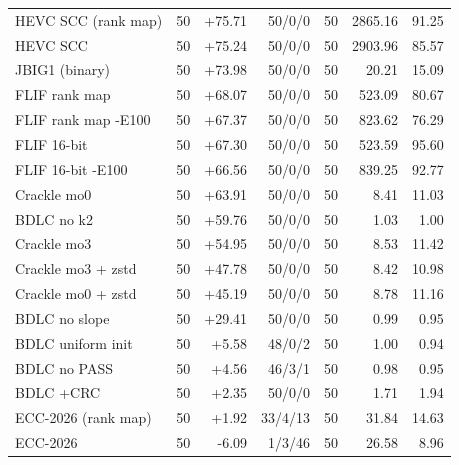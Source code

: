 \begin{table}[t]
\begin{tabular}{lrrrrrr}
HEVC SCC (rank map) & 50 & +75.71 & 50/0/0 & 50 & 2865.16 & 91.25 \\
HEVC SCC & 50 & +75.24 & 50/0/0 & 50 & 2903.96 & 85.57 \\
JBIG1 (binary) & 50 & +73.98 & 50/0/0 & 50 & 20.21 & 15.09 \\
FLIF rank map & 50 & +68.07 & 50/0/0 & 50 & 523.09 & 80.67 \\
FLIF rank map -E100 & 50 & +67.37 & 50/0/0 & 50 & 823.62 & 76.29 \\
FLIF 16-bit & 50 & +67.30 & 50/0/0 & 50 & 523.59 & 95.60 \\
FLIF 16-bit -E100 & 50 & +66.56 & 50/0/0 & 50 & 839.25 & 92.77 \\
Crackle mo0 & 50 & +63.91 & 50/0/0 & 50 & 8.41 & 11.03 \\
BDLC no k2 & 50 & +59.76 & 50/0/0 & 50 & 1.03 & 1.00 \\
Crackle mo3 & 50 & +54.95 & 50/0/0 & 50 & 8.53 & 11.42 \\
Crackle mo3 + zstd & 50 & +47.78 & 50/0/0 & 50 & 8.42 & 10.98 \\
Crackle mo0 + zstd & 50 & +45.19 & 50/0/0 & 50 & 8.78 & 11.16 \\
BDLC no slope & 50 & +29.41 & 50/0/0 & 50 & 0.99 & 0.95 \\
BDLC uniform init & 50 & +5.58 & 48/0/2 & 50 & 1.00 & 0.94 \\
BDLC no PASS & 50 & +4.56 & 46/3/1 & 50 & 0.98 & 0.95 \\
BDLC +CRC & 50 & +2.35 & 50/0/0 & 50 & 1.71 & 1.94 \\
ECC-2026 (rank map) & 50 & +1.92 & 33/4/13 & 50 & 31.84 & 14.63 \\
ECC-2026 & 50 & -6.09 & 1/3/46 & 50 & 26.58 & 8.96 \\
\hline
\end{tabular}
\end{table}
